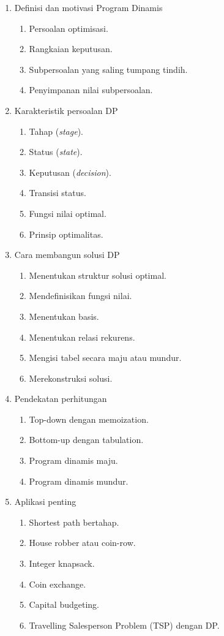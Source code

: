 \begin{enumerate}
    \item Definisi dan motivasi Program Dinamis
    \begin{enumerate}
        \item Persoalan optimisasi.
        \item Rangkaian keputusan.
        \item Subpersoalan yang saling tumpang tindih.
        \item Penyimpanan nilai subpersoalan.
    \end{enumerate}

    \item Karakteristik persoalan DP
    \begin{enumerate}
        \item Tahap (\textit{stage}).
        \item Status (\textit{state}).
        \item Keputusan (\textit{decision}).
        \item Transisi status.
        \item Fungsi nilai optimal.
        \item Prinsip optimalitas.
    \end{enumerate}

    \item Cara membangun solusi DP
    \begin{enumerate}
        \item Menentukan struktur solusi optimal.
        \item Mendefinisikan fungsi nilai.
        \item Menentukan basis.
        \item Menentukan relasi rekurens.
        \item Mengisi tabel secara maju atau mundur.
        \item Merekonstruksi solusi.
    \end{enumerate}

    \item Pendekatan perhitungan
    \begin{enumerate}
        \item Top-down dengan memoization.
        \item Bottom-up dengan tabulation.
        \item Program dinamis maju.
        \item Program dinamis mundur.
    \end{enumerate}

    \item Aplikasi penting
    \begin{enumerate}
        \item Shortest path bertahap.
        \item House robber atau coin-row.
        \item Integer knapsack.
        \item Coin exchange.
        \item Capital budgeting.
        \item Travelling Salesperson Problem (TSP) dengan DP.
    \end{enumerate}
\end{enumerate}

